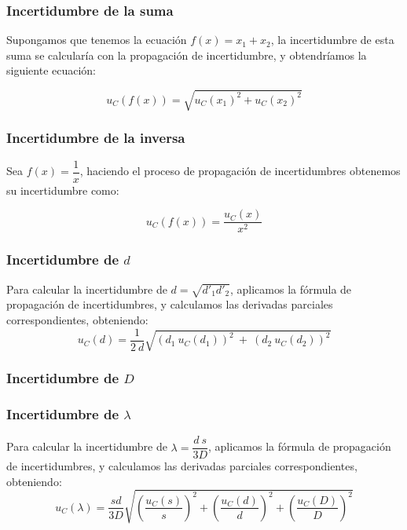 \documentclass[10pt,onecolumn]{article}
\begin{document}
\subsubsection{Incertidumbre de la suma}
Supongamos que tenemos la ecuación $f(x)=x_1+x_2$, la incertidumbre de esta suma se calcularía con la propagación de incertidumbre, y obtendríamos la siguiente ecuación:

\begin{equation}
    \boxed{u_C(f(x))=\sqrt{u_C(x_1)^2+u_C(x_2)^2}}
\end{equation}

\subsubsection{Incertidumbre de la inversa}
Sea $f(x) = \dfrac{1}{x}$, haciendo el proceso de propagación de incertidumbres obtenemos su incertidumbre como:

\begin{equation}
    \boxed{u_C(f(x)) = \dfrac{u_C(x)}{x^2}}
\end{equation}


\subsubsection{Incertidumbre de $d$}
Para calcular la incertidumbre de $d = \sqrt{d'_{1} d'_{2}}$, aplicamos la fórmula de propagación de incertidumbres, y calculamos las derivadas parciales correspondientes, obteniendo:
\begin{equation}
    \boxed{u_C(d) = \dfrac{1}{2\ d}\sqrt{(d_1\ u_C(d_1))^2\ +\ (d_2\ u_C(d_2))^2} }
\end{equation}

\subsubsection{Incertidumbre de $D$}

\subsubsection{Incertidumbre de $\lambda$}
Para calcular la incertidumbre de $\lambda = \dfrac{d\ s}{3D}$, aplicamos la fórmula de propagación de incertidumbres, y calculamos las derivadas parciales correspondientes, obteniendo:
\begin{equation}
    \boxed{u_C(\lambda) = \dfrac{sd}{3D}\sqrt{(\dfrac{u_C(s)}{s})^2 + (\dfrac{u_C(d)}{d})^2 + (\dfrac{u_C(D)}{D})^2}}
\end{equation}
\end{document}
